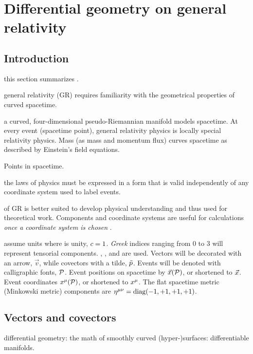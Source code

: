 
\section{Differential geometry on general relativity}

\subsection{Introduction}
%
 this section summarizes \cite{bertschinger:1999}.

 general relativity (GR) requires familiarity with the geometrical properties of curved spacetime.

 a curved, four-dimensional pseudo-Riemannian manifold models spacetime. At every event (spacetime point), general relativity physics is locally special relativity physics. Mass (as mass and momentum flux) curves spacetime as described by Einstein's field equations.

 Points in spacetime.

 the laws of physics must be expressed in a form that is valid independently of any coordinate system used to label events.

 of GR is better suited to develop physical understanding and thus used for theoretical work. Components and coordinate systems are useful for calculations \emph{once a coordinate system is chosen} .

 assume units where  is unity, $c = 1$. \emph{Greek} indices ranging from 0 to 3 will represent tensorial components. , , and  are used. Vectors will be decorated with an arrow, $\vec v$, while covectors with a tilde, $\tilde{p}$. Events will be denoted with calligraphic fonts, $\mathcal{P}$. Event positions on spacetime by $\vec\pos\vat{\event P}$, or shortened to $\vec{x}$. Event coordinates $\tvec\pos\mu\vat{\event P}$, or shortened to $\tvec\pos\mu$. The flat spacetime metric (Minkowski metric) components are $\tvecfmet\mu\nu = \diag\tuple{-1,+1,+1,+1}$.


\subsection{Vectors and covectors}
%
 differential geometry: the math of smoothly curved (hyper-)surfaces: differentiable manifolds.

